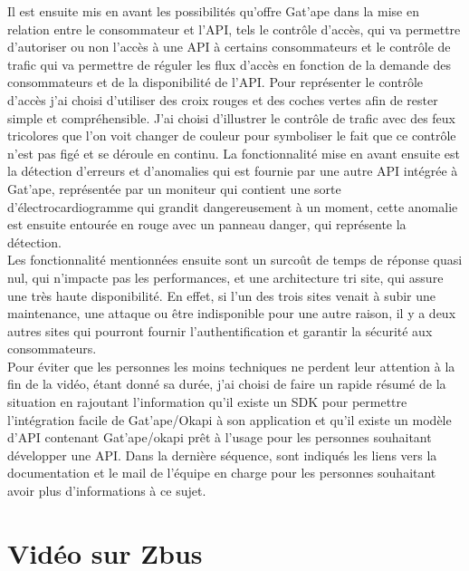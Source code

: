 Il est ensuite mis en avant les possibilités qu'offre Gat'ape dans la mise en relation entre le consommateur et l'API, tels le contrôle d'accès, qui va permettre d'autoriser ou non l'accès à une API à certains consommateurs et le contrôle de trafic qui va permettre de réguler les flux d'accès en fonction de la demande des consommateurs et de la disponibilité de l'API. Pour représenter le contrôle d'accès j'ai choisi d'utiliser des croix rouges et des coches vertes afin de rester simple et compréhensible. J'ai choisi d'illustrer le contrôle de trafic avec des feux tricolores que l'on voit changer de couleur pour symboliser le fait que ce contrôle n'est pas figé et se déroule en continu. La fonctionnalité mise en avant ensuite est la détection d'erreurs et d'anomalies qui est fournie par une autre API intégrée à Gat'ape, représentée par un moniteur qui contient une sorte d'électrocardiogramme qui grandit dangereusement à un moment, cette anomalie est ensuite entourée en rouge avec un panneau danger, qui représente la détection.\\

Les fonctionnalité mentionnées ensuite sont un surcoût de temps de réponse quasi nul, qui n'impacte pas les performances, et une architecture tri site, qui assure  une très haute disponibilité. En effet, si l'un des trois sites venait à subir une maintenance, une attaque ou être indisponible pour une autre raison, il y a deux autres sites qui pourront fournir l'authentification et garantir la sécurité aux consommateurs.\\

Pour éviter que les personnes les moins techniques ne perdent leur attention à la fin de la vidéo, étant donné sa durée, j'ai choisi de faire un rapide résumé de la situation en rajoutant l'information qu'il existe un SDK pour permettre l'intégration facile de Gat'ape/Okapi à son application et qu'il existe un modèle d'API contenant Gat'ape/okapi prêt à l'usage pour les personnes souhaitant développer une API. Dans la dernière séquence, sont indiqués les liens vers la documentation et le mail de l'équipe en charge pour les personnes souhaitant avoir plus d'informations à ce sujet. 



\section{Vidéo sur Zbus}

